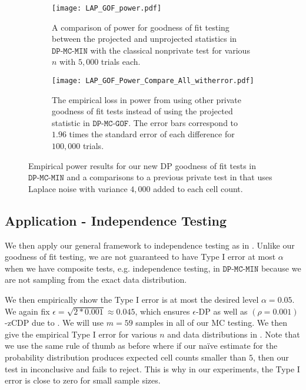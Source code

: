 \documentclass[twoside,letterpaper]{article} \usepackage{aistats2017}
\theoremstyle{definition}
\theoremstyle{remark}
\begin{document}
\begin{figure}
\begin{center}
\begin{subfigure}{.45\textwidth}
\begin{flushleft}
\texttt{[image: LAP\_GOF\_power.pdf]}
\caption{A comparison of power for goodness of fit testing between the projected and unprojected statistics in $\texttt{DP-MC-MIN}$ with the classical nonprivate test for various $n$ with $5,000$ trials each. \label{fig:LAP_power_gof}}
\end{flushleft}
\end{subfigure}
\begin{subfigure}{.1\textwidth}
\end{subfigure}
\hspace{10mm}
\begin{subfigure}{.45\textwidth}
\begin{flushright}
\texttt{[image: LAP\_GOF\_Power\_Compare\_All\_witherror.pdf]}
\caption{The empirical loss in power from using other private goodness of fit tests instead of using the projected statistic in $\texttt{DP-MC-GOF}$.  The error bars correspond to $1.96$ times the standard error of each difference for $100,000$ trials. \label{fig:LAPpower_gof_compare}}
\end{flushright}
\end{subfigure}
\caption{Empirical power results for our new DP goodness of fit tests in $\texttt{DP-MC-MIN}$ and a comparisons to a previous private test in \cite{GLRV16} that uses Laplace noise with variance $4,000$ added to each cell count.}
\end{center}
\end{figure}

\subsection{Application - Independence Testing}
We then apply our general framework to independence testing as in .  Unlike our goodness of fit testing, we are not guaranteed to have Type I error at most $\alpha$ when we have composite tests, e.g. independence testing, in $\texttt{DP-MC-MIN}$ because we are not sampling from the exact data distribution.   

We then empirically show the Type I error is at most the desired level $\alpha = 0.05$.  We again fix $\epsilon = \sqrt{2*0.001} \approx 0.045$, which ensures $\epsilon$-DP as well as $(\rho = 0.001)$-zCDP due to . We will use $m = 59$ samples in all of our MC testing.  We then give the empirical Type I error for various $n$ and data distributions in  .  Note that we use the same rule of thumb as before where if our na\"ive estimate for the probability distribution produces expected cell counts smaller than $5$, then our test in inconclusive and fails to reject.  This is why in our experiments, the Type I error is close to zero for small sample sizes.  
\end{document}
